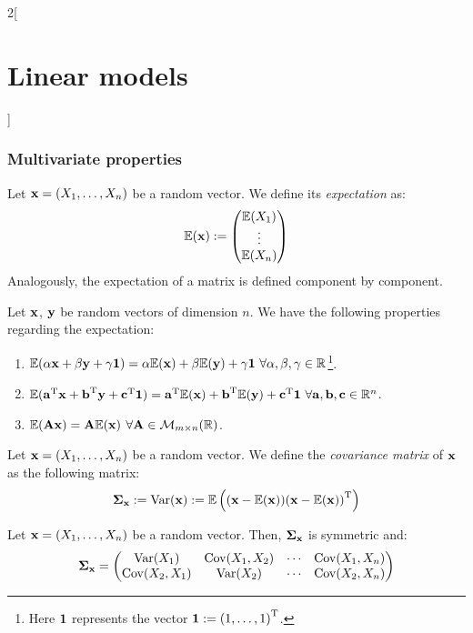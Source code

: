 \documentclass[../../../main_math.tex]{subfiles}
\begin{document}
\begin{multicols}{2}[\section{Linear models}]
  \subsubsection{Multivariate properties}
  \begin{definition}
    Let $\vf{x}=(X_1,\ldots,X_n)$ be a random vector. We define its \emph{expectation} as:
    $$
      \Exp(\vf{x}):=
      \begin{pmatrix}
        \Exp(X_1) \\
        \vdots    \\
        \Exp(X_n)
      \end{pmatrix}
    $$
    Analogously, the expectation of a matrix is defined component by component.
  \end{definition}
  \begin{theorem}
    Let $\vf{x}$, $\vf{y}$ be random vectors of dimension $n$. We have the following properties regarding the expectation:
    \begin{enumerate}
      \item $\Exp(\alpha\vf{x}+\beta\vf{y}+\gamma\vf{1})=\alpha\Exp(\vf{x})+\beta\Exp(\vf{y})+\gamma\vf{1}\ \forall\alpha,\beta,\gamma\in\RR$\footnote{Here $\vf{1}$ represents the vector $\vf{1}:=\transpose{(1,\ldots,1)}$.}.
      \item $\Exp(\transpose{\vf{a}}\vf{x}+\transpose{\vf{b}}\vf{y}+\transpose{\vf{c}}\vf{1})=\transpose{\vf{a}}\Exp(\vf{x})+\transpose{\vf{b}}\Exp(\vf{y})+\transpose{\vf{c}}\vf{1}\ \forall\vf{a},\vf{b},\vf{c}\in\RR^n$.
      \item $\Exp(\vf{Ax})=\vf{A}\Exp(\vf{x})$ $\forall \vf{A}\in\mathcal{M}_{m\times n}(\RR)$.
    \end{enumerate}
  \end{theorem}
  \begin{definition}
    Let $\vf{x}=(X_1,\ldots,X_n)$ be a random vector. We define the \emph{covariance matrix} of $\vf{x}$ as the following matrix:
    $$\vf\Sigma_{\vf{x}}:=\Var(\vf{x}):=\Exp\left((\vf{x}-\Exp(\vf{x}))\transpose{(\vf{x}-\Exp(\vf{x}))}\right)$$
  \end{definition}
  \begin{proposition}
    Let $\vf{x}=(X_1,\ldots,X_n)$ be a random vector. Then, $\vf\Sigma_{\vf{x}}$ is symmetric and:
    $$\vf\Sigma_{\vf{x}}=
      \begin{pmatrix}
        \Var(X_1)     & \cov(X_1,X_2) & \cdots & \cov(X_1,X_n) \\
        \cov(X_2,X_1) & \Var(X_2)     & \cdots & \cov(X_2,X_n) \\

\end{pmatrix}$$
\end{proposition}
\end{multicols}
\end{document}
